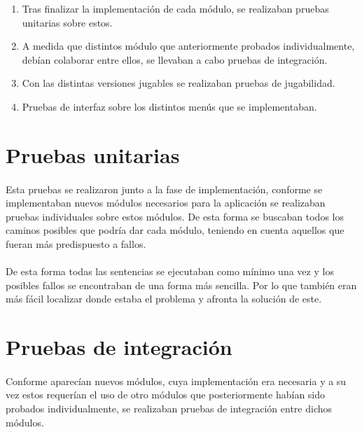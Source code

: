 \begin{enumerate}
    \item Tras finalizar la implementación de cada módulo, se realizaban pruebas unitarias sobre estos.
    \item A medida que distintos módulo que anteriormente probados individualmente, debían colaborar entre ellos, se
    llevaban a cabo pruebas de integración.
    \item Con las distintas versiones jugables se realizaban pruebas de jugabilidad.
    \item Pruebas de interfaz sobre los distintos menús que se implementaban.
\end{enumerate}

\section{Pruebas unitarias}

\paragraph{}
Esta pruebas se realizaron junto a la fase de implementación, conforme se implementaban nuevos módulos necesarios para la aplicación
se realizaban pruebas individuales sobre estos módulos. De esta forma se buscaban todos los caminos posibles que podría dar cada 
módulo, teniendo en cuenta aquellos que fueran más predispuesto a fallos.

\paragraph{}
De esta forma todas las sentencias se ejecutaban como mínimo una vez y los posibles fallos se encontraban de una forma más sencilla.
Por lo que también eran más fácil localizar donde estaba el problema y afronta la solución de este.

\section{Pruebas de integración}

\paragraph{}
Conforme aparecían nuevos módulos, cuya implementación era necesaria y a su vez estos requerían el uso de otro módulos que 
posteriormente habían sido probados individualmente, se realizaban pruebas de integración entre dichos módulos.

